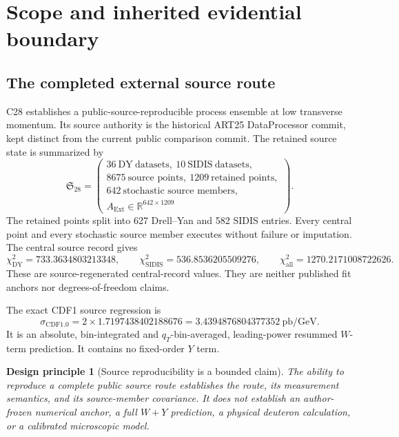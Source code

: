 \documentclass[11pt]{article}
\newtheorem{principle}[definition]{Design principle}
\newcommand{\DY}{\ensuremath{\mathrm{DY}}}
\newcommand{\SIDIS}{\ensuremath{\mathrm{SIDIS}}}
\newcommand{\Ext}{\ensuremath{\mathrm{Ext}}}
\newcommand{\R}{\mathbb R}
\begin{document}
\tableofcontents
\newpage

\section{Scope and inherited evidential boundary}
\label{sec:scope}

\subsection{The completed external source route}

C28 establishes a public-source-reproducible process ensemble at low transverse momentum.  Its source authority is the historical ART25 DataProcessor commit, kept distinct from the current public comparison commit.  The retained source state is summarized by
\begin{equation}
 \mathfrak S_{28}
 =
 \left(
 \begin{gathered}
 36\ \DY\ \text{datasets},\ 10\ \SIDIS\ \text{datasets},\\
 8675\ \text{source points},\ 1209\ \text{retained points},\\
 642\ \text{stochastic source members},\\
 A_{\Ext}\in\R^{642\times1209}
 \end{gathered}
 \right).
 \label{eq:c28-state}
\end{equation}
The retained points split into 627 Drell--Yan and 582 SIDIS entries.  Every central point and every stochastic source member executes without failure or imputation.  The central source record gives
\begin{equation}
 \chi^2_{\DY}=733.3634803213348,
 \qquad
 \chi^2_{\SIDIS}=536.8536205509276,
 \qquad
 \chi^2_{\mathrm{all}}=1270.2171008722626.
 \label{eq:c28-chi2}
\end{equation}
These are source-regenerated central-record values.  They are neither published fit anchors nor degrees-of-freedom claims.

The exact CDF1 source regression is
\begin{equation}
 \sigma_{\mathrm{CDF1.0}}
 =
 2\times1.7197438402188676
 =
 3.4394876804377352\ \mathrm{pb/GeV}.
 \label{eq:cdf1-authority}
\end{equation}
It is an absolute, bin-integrated and \(q_T\)-bin-averaged, leading-power resummed \(W\)-term prediction.  It contains no fixed-order \(Y\) term.

\begin{principle}[Source reproducibility is a bounded claim]
The ability to reproduce a complete public source route establishes the route, its measurement semantics, and its source-member covariance.  It does not establish an author-frozen numerical anchor, a full \(W+Y\) prediction, a physical deuteron calculation, or a calibrated microscopic model.
\end{principle}
\end{document}
